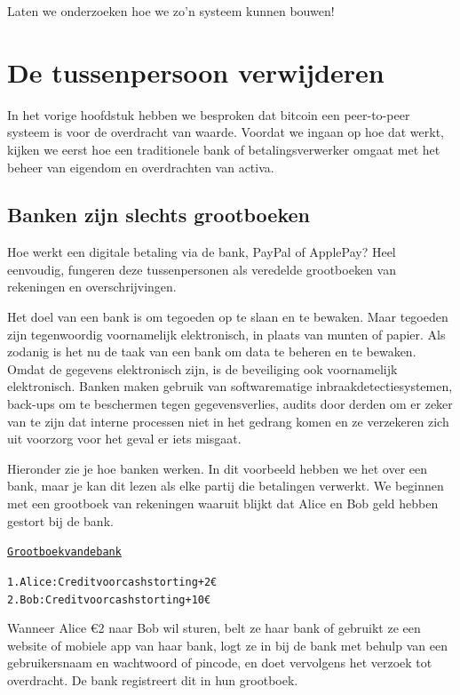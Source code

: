 \documentclass[smalldemyvopaper,11pt,twoside,onecolumn,openright,extrafontsizes]{memoir}
\begin{document}
Laten we onderzoeken hoe we zo'n systeem kunnen bouwen!




\hypertarget{chap2}{%
\chapter{De tussenpersoon verwijderen}\label{chap2}}

In het vorige hoofdstuk hebben we besproken dat bitcoin een peer-to-peer systeem is voor de overdracht van waarde. Voordat we ingaan op hoe dat werkt, kijken we eerst hoe een traditionele bank of betalingsverwerker omgaat met het beheer van eigendom en overdrachten van activa.

\section{Banken zijn slechts grootboeken}

Hoe werkt een digitale betaling via de bank, PayPal of ApplePay? Heel eenvoudig, fungeren deze tussenpersonen als veredelde grootboeken van rekeningen en overschrijvingen.

Het doel van een bank is om tegoeden op te slaan en te bewaken. Maar tegoeden zijn tegenwoordig voornamelijk elektronisch, in plaats van munten of papier. Als zodanig is het nu de taak van een bank om data te beheren en te bewaken. Omdat de gegevens elektronisch zijn, is de beveiliging ook voornamelijk elektronisch. Banken maken gebruik van softwarematige inbraakdetectiesystemen, back-ups om te beschermen tegen gegevensverlies, audits door derden om er zeker van te zijn dat interne processen niet in het gedrang komen en ze verzekeren zich uit voorzorg voor het geval er iets misgaat.

Hieronder zie je hoe banken werken. In dit voorbeeld hebben we het over een bank, maar je kan dit lezen als elke partij die betalingen verwerkt. We beginnen met een grootboek van rekeningen waaruit blijkt dat Alice en Bob geld hebben gestort bij de bank.

\begin{alltt}
\underline{Grootboek van de bank}

    1. Alice: Credit voor cash storting +2€
    2. Bob: Credit voor cash storting +10€
\end{alltt}

Wanneer Alice €2 naar Bob wil sturen, belt ze haar bank of gebruikt ze een website of mobiele app van haar bank, logt ze in bij de bank met behulp van een gebruikersnaam en wachtwoord of pincode, en doet vervolgens het verzoek tot overdracht. De bank registreert dit in hun grootboek.
\end{document}
